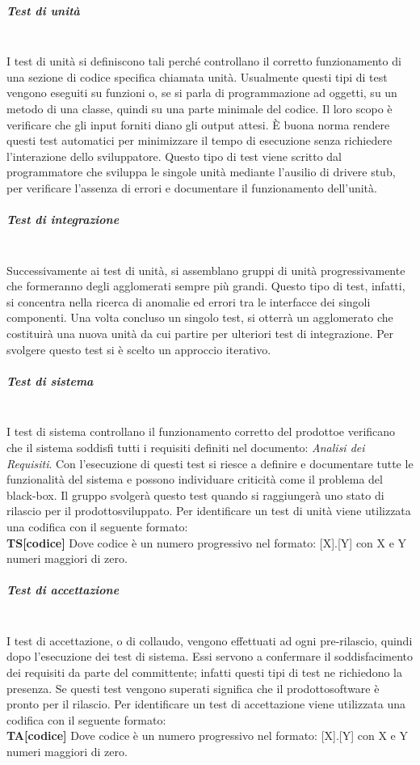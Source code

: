 \subparagraph*{Test di unità} \mbox{}\\ [1mm]
I test di unità si definiscono tali perché controllano il corretto funzionamento di una sezione di codice specifica chiamata unità. Usualmente questi tipi di test vengono eseguiti su funzioni o, se si parla di programmazione ad oggetti, su un metodo di una classe, quindi su una parte minimale del codice. Il loro scopo è verificare che gli input forniti diano gli output attesi. È buona norma rendere questi test automatici per minimizzare il tempo di esecuzione senza richiedere l'interazione dello sviluppatore. Questo tipo di test viene scritto dal programmatore che sviluppa le singole unità mediante l'ausilio di driver\glosp e stub\glo, per verificare l'assenza di errori e documentare il funzionamento dell'unità.

\subparagraph*{Test di integrazione} \mbox{}\\ [1mm]
Successivamente ai test di unità, si assemblano gruppi di unità progressivamente che formeranno degli agglomerati sempre più grandi. Questo tipo di test, infatti, si concentra nella ricerca di anomalie ed errori tra le interfacce dei singoli componenti. Una volta concluso un singolo test, si otterrà un agglomerato che costituirà una nuova unità da cui partire per ulteriori test di integrazione. Per svolgere questo test si è scelto un approccio iterativo.

\subparagraph*{Test di sistema} \mbox{}\\ [1mm]
I test di sistema controllano il funzionamento corretto del prodotto\glosp e verificano che il sistema soddisfi tutti i requisiti definiti nel documento: \textit{Analisi dei Requisiti}. Con l'esecuzione di questi test si riesce a definire e documentare tutte le funzionalità del sistema e possono individuare criticità come il problema del black-box\glo. Il gruppo svolgerà questo test quando si raggiungerà uno stato di rilascio per il prodotto\glosp sviluppato.
Per identificare un test di unità viene utilizzata una codifica con il seguente formato:\\
\textbf{TS[codice]}
Dove codice è un numero progressivo nel formato: [X].[Y] con X e Y numeri maggiori di zero.

\subparagraph*{Test di accettazione} \mbox{}\\ [1mm]
I test di accettazione, o di collaudo, vengono effettuati ad ogni pre-rilascio, quindi dopo l'esecuzione dei test di sistema. Essi servono a confermare il soddisfacimento dei requisiti da parte del committente; infatti questi tipi di test ne richiedono la presenza. Se questi test vengono superati significa che il prodotto\glosp software è pronto per il rilascio. 
Per identificare un test di accettazione viene utilizzata una codifica con il seguente formato:\\
\textbf{TA[codice]}
Dove codice è un numero progressivo nel formato: [X].[Y] con X e Y numeri maggiori di zero.
